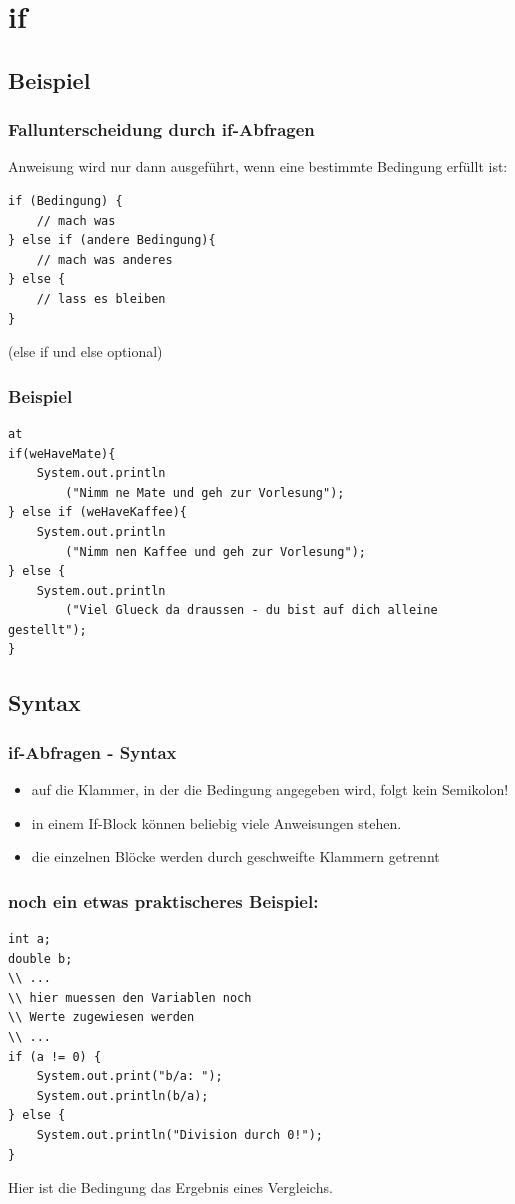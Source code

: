 \documentclass[final]{beamer}
\begin{document}
\section{if}
\subsection{Beispiel}
\begin{frame}[containsverbatim]
	\frametitle{Fallunterscheidung durch if-Abfragen}
	Anweisung wird nur dann ausgeführt, wenn eine bestimmte Bedingung erfüllt ist:
	\begin{lstlisting}
if (Bedingung) {
	// mach was
} else if (andere Bedingung){
	// mach was anderes
} else {
	// lass es bleiben
}
	\end{lstlisting}
	(else if und else optional)
\end{frame}

\begin{frame}[containsverbatim]
	\frametitle{Beispiel}
	\begin{lstlisting}at
if(weHaveMate){
	System.out.println
		("Nimm ne Mate und geh zur Vorlesung");
} else if (weHaveKaffee){
	System.out.println
		("Nimm nen Kaffee und geh zur Vorlesung");
} else {
	System.out.println
		("Viel Glueck da draussen - du bist auf dich alleine gestellt");
}
	\end{lstlisting}
\end{frame}

\subsection{Syntax}
\begin{frame}
	\frametitle{if-Abfragen - Syntax}
	\begin{itemize}
		\item{auf die Klammer, in der die Bedingung angegeben wird, folgt kein Semikolon!}
		\item{in einem If-Block können beliebig viele Anweisungen stehen.}
		\item{die einzelnen Blöcke werden durch geschweifte Klammern getrennt}
	\end{itemize}
\end{frame}

\begin{frame}[containsverbatim]
	\frametitle{noch ein etwas praktischeres Beispiel:}
	\begin{lstlisting}
int a;
double b;
\\ ...
\\ hier muessen den Variablen noch
\\ Werte zugewiesen werden
\\ ...
if (a != 0) {
	System.out.print("b/a: ");
	System.out.println(b/a);
} else {
	System.out.println("Division durch 0!");
}
	\end{lstlisting}
	Hier ist die Bedingung das Ergebnis eines Vergleichs.
\end{frame}
\end{document}
